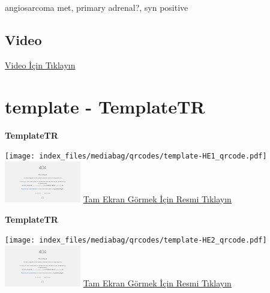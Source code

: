 \documentclass[
  letterpaper,
  DIV=11,
  numbers=noendperiod]{scrreprt}
\begin{document}
\begin{tcolorbox}[enhanced jigsaw, breakable, opacitybacktitle=0.6, arc=.35mm, colbacktitle=quarto-callout-tip-color!10!white, colback=white, toptitle=1mm, left=2mm, opacityback=0, colframe=quarto-callout-tip-color-frame, titlerule=0mm, rightrule=.15mm, bottomrule=.15mm, toprule=.15mm, bottomtitle=1mm, title=\textcolor{quarto-callout-tip-color}{\faLightbulb}\hspace{0.5em}{Tanı}, coltitle=black, leftrule=.75mm]

angiosarcoma met, primary adrenal?, syn positive

\end{tcolorbox}

\hypertarget{video-30}{%
\subsection{Video}\label{video-30}}

\href{https://www.youtube.com/watch?v=KHM2yQkRIV8}{Video İçin Tıklayın}

\hypertarget{sec-template}{%
\section{template - TemplateTR}\label{sec-template}}

\textbf{TemplateTR}

\texttt{[image: index\_files/mediabag/qrcodes/template-HE1\_qrcode.pdf]}
\href{https://images.patolojiatlasi.com/template/HE1.html}{\includegraphics[width=0.25\textwidth,height=\textheight]{./screenshots/thumbnail_template-HE1.png}}
\href{https://images.patolojiatlasi.com/template/HE1.html}{Tam Ekran
Görmek İçin Resmi Tıklayın}

\textbf{TemplateTR}

\texttt{[image: index\_files/mediabag/qrcodes/template-HE2\_qrcode.pdf]}
\href{https://images.patolojiatlasi.com/template/HE2.html}{\includegraphics[width=0.25\textwidth,height=\textheight]{./screenshots/thumbnail_template-HE2.png}}
\href{https://images.patolojiatlasi.com/template/HE2.html}{Tam Ekran
Görmek İçin Resmi Tıklayın}
\end{document}
